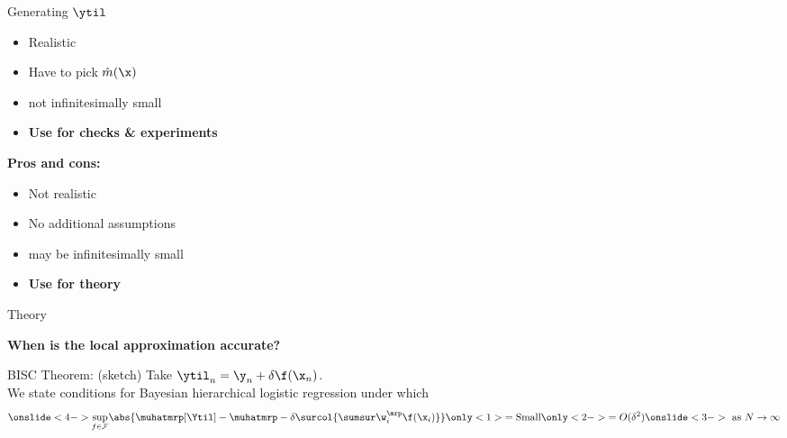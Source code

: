 \begin{frame}[t]{Generating $\ytil$}
{{    \begin{itemize}
    \item Realistic
    \item Have to pick $\hat{m}(\x)$
    \item \surcol{$\Ytil - \Ysur$} not infinitesimally small
    \item \textbf{Use for checks \& experiments}
    \end{itemize}
    }
    {
\textbf{Pros and cons:}
    \begin{itemize}
    \item Not realistic
    \item No additional assumptions
    \item \surcol{$\Ytil - \Ysur$} may be infinitesimally small
    \item \textbf{Use for theory}
    \end{itemize}
    }
}



\end{frame}


\begin{frame}[c]{Theory}

\textbf{When is the local approximation accurate?}

\begin{block}{BISC Theorem: (sketch)}
    Take $\ytil_n = \y_n + \delta \f(\x_n)$.\\[1em]
    We state conditions for Bayesian hierarchical logistic regression under which
$$
\onslide<4->{\sup_{f \in \mathcal{F}}}
\abs{
    \muhatmrp[\Ytil] - \muhatmrp
    - \delta \surcol{\sumsur \w_i^\mrp \f(\x_i)}
}
\only<1>{ = \textrm{Small}}
\only<2->{ = O(\delta^2)}
\onslide<3->{\textrm{ as }N \rightarrow \infty}
$$
\end{block}




\end{frame}
